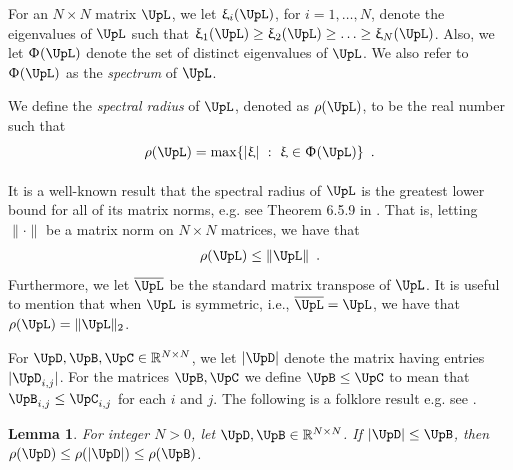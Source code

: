 \documentclass[11pt,reqno]{amsart}
\numberwithin{equation}{section}
\newtheorem{lemma}[theorem]{Lemma}
\newcommand{\blue}[1]{{\color{blue}#1}}
\newcommand{\goldenbrown}[1]{{\color{goldenbrown}#1}}
\newcommand{\spradius}{{\rho}}
\newcommand{\eigenval}{\upxi}
\newcommand{\enorm}[1]{ \goldenbrown{\|} #1 \goldenbrown{\|}}
\newcommand{\norm}[2]{\goldenbrown{\|} #1 \goldenbrown{\|}_{#2}}
\newcommand{\abs}[1]{\blue{|}#1\blue{|}}
\newcommand{\spectrum}{{\Upphi}}
\newcommand{\MTR}[1]{\overline{#1}}
\renewcommand{\blue}[1]{#1}
\renewcommand{\goldenbrown}[1]{#1}
\begin{document}
For an $N\times N$ matrix $\UpL$, we let $\eigenval_i(\UpL)$, for $i=1,\ldots, N$, denote the eigenvalues of $\UpL$ such that
$\eigenval_1(\UpL)\geq \eigenval_2(\UpL) \geq \ldots \geq \eigenval_N(\UpL)$.
%
Also, we let $\spectrum(\UpL)$ denote the set of distinct eigenvalues of $\UpL$. We also refer to $\spectrum(\UpL)$ 
as the {\em spectrum} of $\UpL$. 
 

We define the {\em spectral radius} of $\UpL$, denoted as $\spradius(\UpL)$, to be the real number
such that 
\begin{align}\nonumber %
\spradius(\UpL)=\max_{}\{ |\eigenval| \ : \ \eigenval\in \spectrum(\UpL) \} \enspace.
\end{align}




It is a well-known result that the spectral radius of $\UpL$ is the greatest lower bound for all 
of its matrix norms, e.g. see Theorem 6.5.9 in \cite{MatrixAnalysis}. 
That is, letting $\enorm{\cdot} $ be  a matrix norm on $N\times N$ matrices, we have that
\begin{align}\label{eq:SpRadiusVsMNorm}
\spradius(\UpL) \leq \enorm{ \UpL}  \enspace.
\end{align}
Furthermore, we let $\MTR{\UpL}$ be the standard matrix transpose of $\UpL$. 
It is useful to mention that when $\UpL$ is symmetric, i.e., $\MTR{\UpL}=\UpL$,
% 
we have that $\spradius(\UpL) = \norm{\UpL}{2}$.



For $\UpD, \UpB, \UpC \in \mathbb{R}^{ N \times N}$, we let $|\UpD|$ denote the matrix having entries $|\UpD_{i,j}|$.
 For the matrices $\UpB, \UpC$ we define $\UpB\leq \UpC$ to mean that $\UpB_{i,j}\leq \UpC_{i,j}$ for each $i$ and $j$.
The following is a folklore result e.g. see \cite{SIAM-LAlg,MatrixAnalysis}.

\begin{lemma}\label{lemma:MonotoneVsSRad}
For integer $N>0$, let $\UpD, \UpB\in \mathbb{R}^{N\times N}$. If $\abs{\UpD}\leq \UpB$, then 
$\spradius(\UpD) \leq \spradius (\abs{\UpD}) \leq \spradius(\UpB)$.
\end{lemma}
\end{document}
